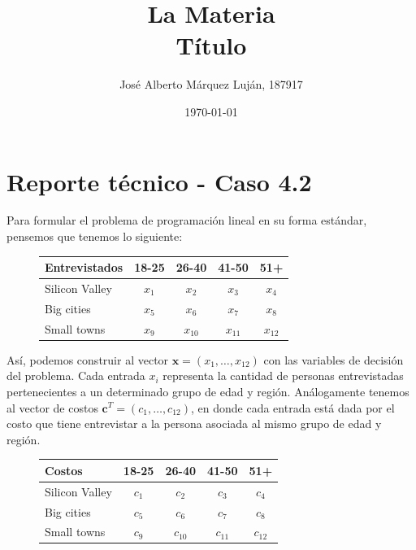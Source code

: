 \documentclass[12pt]{article}
\title{
    La Materia \\
    \large Título
}
\author{José Alberto Márquez Luján, 187917}
\date{\today}
\begin{document}


\section{Reporte técnico - Caso 4.2}
Para formular el problema de programación lineal en su forma estándar, pensemos que tenemos lo siguiente:
\begin{figure}[ht]
    \centering
    \begin{tabular}{|l|c|c|c|c|}
     \hline
     \textbf{Entrevistados} & 18-25 & 26-40 & 41-50 & 51+ \\
     \hline 
     Silicon Valley & $x_1$ & $x_2$    & $x_3$    & $x_4$ \\
     Big cities     & $x_5$ & $x_6$    & $x_7$    & $x_8$ \\
     Small towns    & $x_9$ & $x_{10}$ & $x_{11}$ & $x_{12}$ \\
     \hline 
    \end{tabular}    
    \label{fig:tabla1}
\end{figure}

Así, podemos construir al vector $\pmb{x} = (x_1, \ldots, x_{12})$ con las variables de decisión del problema. Cada entrada $x_i$ representa la cantidad de personas entrevistadas pertenecientes a un determinado grupo de edad y región. Análogamente tenemos al vector de costos $\pmb{c}^T = (c_1, \ldots, c_{12})$, en donde cada entrada está dada por el costo que tiene entrevistar a la persona asociada al mismo grupo de edad y región.
\begin{figure}[ht]
    \centering
    \begin{tabular}{|l|c|c|c|c|}
     \hline
     \textbf{Costos} & 18-25 & 26-40 & 41-50 & 51+ \\
     \hline 
     Silicon Valley & $c_1$ & $c_2$    & $c_3$    & $c_4$ \\
     Big cities     & $c_5$ & $c_6$    & $c_7$    & $c_8$ \\
     Small towns    & $c_9$ & $c_{10}$ & $c_{11}$ & $c_{12}$ \\
     \hline 
    \end{tabular}    
    \label{fig:tabla2}
\end{figure}
\end{document}
